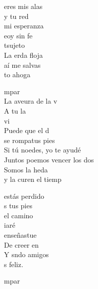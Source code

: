 \begin{cancion}%
	 eres mis alas\\
	 y tu red\\
	 mi esperanza\\
	 eoy sin fe\\
	tsujeto  \\
	La erda floja\\
	 aí me salvas\\
	to ahoga\jump\\
	\begin{chorus}%
		mpar \\
		La aveura de la v \\
		A tu la \\
		vi  \\
		Puede que el d \\
		se rompatus pies  \\
		Si tú noedes, yo te ayudé \\
		Juntos poemos vencer los dos\\
		Somos la heda \\
		y la curen el tiemp  \jump\\
	\end{chorus}%
	estás perdido\\
	 s tus pies\\
	 el camino\\
	 iaré\\
	  enseñastue\\
	De creer en  \\
	Y sndo amigos\\
	s feliz.\jump\\
	\begin{chorus}%
		mpar\chord{mi}{m}{tir} \\

\end{chorus}
\end{cancion}
